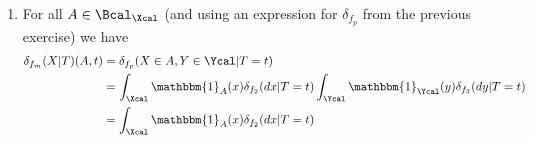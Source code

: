 \begin{enumerate}[label=3.\arabic*]
\begin{ungradedsolution}
\begin{enumerate}
\begin{enumerate}
                \item $\{A\times B: A\in\Bcal_\Xcal , B\in \Bcal_\Ycal\}$ is a $\pi$-system.
            \end{enumerate}
            So, we have to test the provided equality only on sets $A\times B: A\in\Bcal_\Xcal, B\in\Bcal_\Ycal$. For all such $A$ and $B$ and $t\in\Tcal$ we have
            \begin{align*}
                [\delta_{f_2}(X|T)\otimes \delta_{f_3}(Y|T)](A\times B, t)
                 & = \int_\Xcal\int_\Ycal \mathbbm{1}_{A\times B}(x, y)\delta_{f_2}(dx|T=t)\delta_{f_3}(dx|T=t)        \\
                 & = \int_\Xcal\int_\Ycal \mathbbm{1}_{A}(x)\mathbbm{1}_{B}(y)\delta_{f_2}(dx|T=t)\delta_{f_3}(dx|T=t) \\
                 & = \int_\Xcal \mathbbm{1}_{A}(x)\delta_{f_2}(dx|T=t)\int_\Ycal\mathbbm{1}_{B}(y)\delta_{f_3}(dx|T=t) \\
                 & = \delta_{f_2}(A|T=t)\delta_{f_3}(B|T=t)                                                            \\
                 & = \mathbbm{1}_{A}(f_2(t))\mathbbm{1}_{B}(f_3(t))                                                    \\
                 & = \mathbbm{1}_{A\times B}(f_2(t), f_3(t))                                                           \\
                 & = \delta_{(f_2, f_3)}(A\times B|T=t)                                                                \\
                 & = [\delta_{(f_2, f_3)}(X, Y|T)](A\times B, t)                                                       \\
                 & =: [\delta_{f_p}(X, Y|T)](A\times B, t),
            \end{align*}
            so $f_p = (f_2, f_3)$.
            \item For all $A\in \Bcal_\Xcal$ (and using an expression for $\delta_{f_p}$ from the previous exercise) we have
            \begin{align*}
                \delta_{f_m}(X|T)(A, t)
                 & = \delta_{f_p}(X\in A, Y\in\Ycal|T=t)                                                              \\
                 & = \int_\Xcal\mathbbm{1}_A(x)\delta_{f_2}(dx|T=t)\int_\Ycal\mathbbm{1}_\Ycal(y)\delta_{f_3}(dy|T=t) \\
                 & = \int_\Xcal\mathbbm{1}_A(x)\delta_{f_2}(dx|T=t)                                                   \\

\end{align*}
\end{enumerate}
\end{ungradedsolution}
\end{enumerate}
